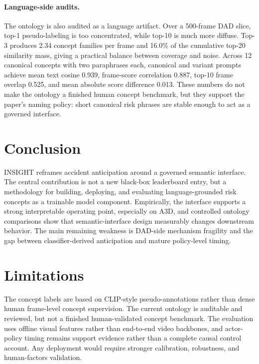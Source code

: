 \documentclass[11pt]{article}
\newcommand{\method}{\textsc{INSIGHT}}
\begin{document}
\paragraph{Language-side audits.}
The ontology is also audited as a language artifact. Over a 500-frame DAD slice,
top-1 pseudo-labeling is too concentrated, while top-10 is much more diffuse.
Top-3 produces 2.34 concept families per frame and 16.0\% of the cumulative
top-20 similarity mass, giving a practical balance between coverage and noise.
Across 12 canonical concepts with two paraphrases each, canonical and variant
prompts achieve mean text cosine 0.939, frame-score correlation 0.887, top-10
frame overlap 0.525, and mean absolute score difference 0.013. These numbers do
not make the ontology a finished human concept benchmark, but they support the
paper's naming policy: short canonical risk phrases are stable enough to act as
a governed interface.

\FloatBarrier

\section{Conclusion}

\method{} reframes accident anticipation around a governed semantic interface.
The central contribution is not a new black-box leaderboard entry, but a
methodology for building, deploying, and evaluating language-grounded risk
concepts as a trainable model component. Empirically, the interface supports a
strong interpretable operating point, especially on A3D, and controlled ontology
comparisons show that semantic-interface design measurably changes downstream
behavior. The main remaining weakness is DAD-side mechanism fragility and the
gap between classifier-derived anticipation and mature policy-level timing.

\section*{Limitations}
The concept labels are based on CLIP-style pseudo-annotations rather than dense
human frame-level concept supervision. The current ontology is auditable and
reviewed, but not a finished human-validated concept benchmark. The evaluation
uses offline visual features rather than end-to-end video backbones, and
actor-policy timing remains support evidence rather than a complete causal
control account. Any deployment would require stronger calibration, robustness,
and human-factors validation.



\clearpage
\appendix

\end{document}
